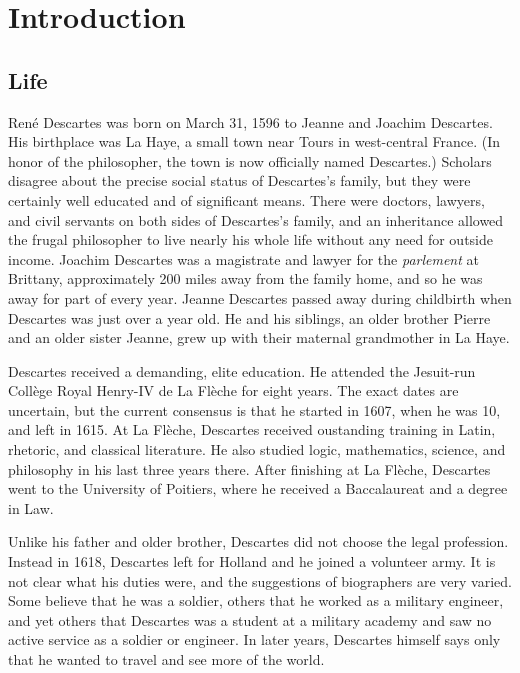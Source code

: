 \chapter{Introduction}

\section{Life}

René Descartes was born on March 31, 1596 to Jeanne and Joachim Descartes. His birthplace was La Haye, a small town near Tours in west-central France. (In honor of the philosopher, the town is now officially named Descartes.) Scholars disagree about the precise social status of Descartes's family, but they were certainly well educated and of significant means. There were doctors, lawyers, and civil servants on both sides of Descartes's family, and an inheritance allowed the frugal philosopher to live nearly his whole life without any need for outside income. Joachim Descartes was a magistrate and lawyer for the \textit{parlement} at Brittany, approximately 200 miles away from the family home, and so he was away for part of every year. Jeanne Descartes passed away during childbirth when Descartes was just over a year old. He and his siblings, an older brother Pierre and an older sister Jeanne, grew up with their maternal grandmother in La Haye.

Descartes received a demanding, elite education. He attended the Jesuit-run Collège Royal Henry-IV de La Flèche for eight years. The exact dates are uncertain, but the current consensus is that he started in 1607, when he was 10, and left in 1615. At La Flèche, Descartes received oustanding training in Latin, rhetoric, and classical literature. He also studied logic, mathematics, science, and philosophy in his last three years there. After finishing at La Flèche, Descartes went to the University of Poitiers, where he received a Baccalaureat and a degree in Law.

Unlike his father and older brother, Descartes did not choose the legal profession. Instead in 1618, Descartes left for Holland and he joined a volunteer army. It is not clear what his duties were, and the suggestions of biographers are very varied. Some believe that he was a soldier, others that he worked as a military engineer, and yet others that Descartes was a student at a military academy and saw no active service as a soldier or engineer. In later years, Descartes himself says only that he wanted to travel and see more of the world.

